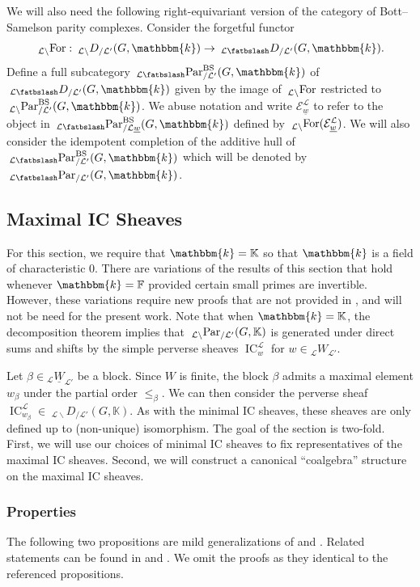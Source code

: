 \documentclass{amsart}
\newcommand{\F}{\mathbb{F}}
\newcommand{\K}{\mathbb{K}}
\renewcommand{\k}{\mathbbm{k}}
\newcommand{\scrE}{\mathcal{E}}
\newcommand{\scrL}{\mathcal{L}}
\DeclareMathOperator{\IC}{IC}
\DeclareMathOperator{\BS}{BS}
\newcommand{\DME}[2]{\:_{#1 \smallleftdash} D_{/ #2} }
\newcommand{\DEE}[2]{\:_{#1 \backslash} D_{/ #2} }
\newcommand{\PME}[2]{\:_{#1 \smallleftdash} \textnormal{Par}_{/ #2} }
\newcommand{\PEE}[2]{\:_{#1 \backslash} \textnormal{Par}_{/ #2} }
\newcommand{\ForME}[1]{\:_{#1 \backslash} \textnormal{For}}
\newcommand{\W}[2]{{}_{#1}W_{#2}}
\newcommand{\uW}[2]{{}_{#1}\underline{W}_{#2}}
\newcommand{\uw}{\underline{w}}
\newcommand{\bfslash}{\mathbin{\fatbslash}}
\newcommand*\smallleftdash{\bfslash}
\theoremstyle{definition}
\numberwithin{equation}{subsection}
\begin{document}
We will also need the following right-equivariant version of the category of Bott--Samelson parity complexes. Consider the forgetful functor
\[\ForME{\scrL} : \DEE{\scrL}{\scrL'} (G, \k) \to \DME{\scrL}{\scrL'} (G, \k).\]
Define a full subcategory $\PME{\scrL}{\scrL'}^{\BS} (G, \k)$ of $\DME{\scrL}{\scrL'} (G, \k)$ given by the image of $\ForME{\scrL}$ restricted to $\PEE{\scrL}{\scrL'}^{\BS} (G, \k)$.
We abuse notation and write $\scrE_{\uw}^{\scrL}$ to refer to the object in $\PME{\scrL}{\scrL \uw}^{\BS} (G, \k)$ defined by $\ForME{\scrL} (\scrE_{\uw}^{\scrL})$.
We will also consider the idempotent completion of the additive hull of $\PME{\scrL}{\scrL'}^{\BS} (G, \k)$ which will be denoted by $\PME{\scrL}{\scrL'} (G, \k)$.

\subsection{Maximal IC Sheaves}

For this section, we require that $\k = \K$ so that $\k$ is a field of characteristic 0. 
There are variations of the results of this section that hold whenever $\k = \F$ provided certain small primes are invertible.
However, these variations require new proofs that are not provided in \cite{Sandvik}, and will not be need for the present work.
Note that when $\k = \K$, the decomposition theorem implies that $\PEE{\scrL}{\scrL'} (G, \K)$ is generated under direct sums and shifts by the simple perverse sheaves $\IC_w^{\scrL}$ for $w \in \W{\scrL}{\scrL'}$.

Let $\beta \in \uW{\scrL}{\scrL'}$ be a block. Since $W$ is finite, the block $\beta$ admits a maximal element $w_{\beta}$ under the partial order $\leq_{\beta}$.
We can then consider the perverse sheaf $\IC_{w_{\beta}}^{\scrL} \in \DEE{\scrL}{\scrL'} (G, \K)$. As with the minimal IC sheaves, these sheaves are only defined up to (non-unique) isomorphism.
The goal of the section is two-fold. First, we will use our choices of minimal IC sheaves to fix representatives of the maximal IC sheaves. 
Second, we will construct a canonical ``coalgebra'' structure on the maximal IC sheaves.

\subsubsection{Properties}

The following two propositions are mild generalizations of \cite[Proposition 4.4.3]{Sandvik} and \cite[Proposition 4.4.5]{Sandvik}. 
Related statements can be found in \cite[Proposition 6.2]{LY} and \cite[Proposition 6.4]{LY}.
We omit the proofs as they identical to the referenced propositions.
\end{document}

